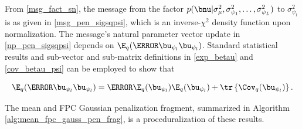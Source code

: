 \documentclass[12pt]{article}
\def\sigsqmu{\sigma^2_{\mu}}
\newcommand\upsi[1]{\bu_{\psi_{#1}}}
\newcommand\sigsqpsi[1]{\sigma^2_{\psi_{#1}}}
\theoremstyle{plain}
\theoremstyle{definition}
\theoremstyle{remark}
\begin{document}
\noindent From \eqref{msg_fact_sn}, the message from the factor $p(\bnu | \sigsqmu, \sigsqpsi{1}, \dots,
\sigsqpsi{L})$ to $\sigsqpsi{l}$ is as given in \eqref{msg_pen_sigsqpsi}, which is an inverse-$\chi^2$
density function upon normalization. The message's natural parameter vector update in \eqref{np_pen_sigsqpsi}
depends on $\E_q (\T{\upsi{l}} \upsi{l})$. Standard statistical results and sub-vector and sub-matrix definitions in
\eqref{exp_betau} and \eqref{cov_betau_psi} can be employed to show that

\[
	\E_q (\T{\upsi{l}} \upsi{l}) = \T{\E_q (\upsi{l})} \E_q (\upsi{l}) + \tr \left\{ \Cov_q (\upsi{l}) \right\}.
\]

The mean and FPC Gaussian penalization fragment, summarized in Algorithm \ref{alg:mean_fpc_gauss_pen_frag},
is a proceduralization of these results.
\end{document}
